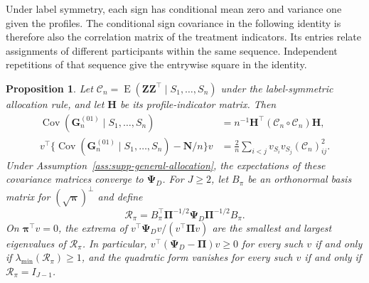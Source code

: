 \documentclass[12pt,a4paper]{article}
\newtheorem{proposition}{Proposition}
\theoremstyle{definition}
\theoremstyle{remark}\newtheorem{remark}{Remark}
\numberwithin{equation}{section}
\newcommand{\E}{\operatorname{E}}
\newcommand{\Cov}{\operatorname{Cov}}
\begin{document}
Under label symmetry, each sign has conditional mean zero and variance one given the profiles. The conditional sign covariance in the following identity is therefore also the correlation matrix of the treatment indicators. Its entries relate assignments of different participants within the same sequence. Independent repetitions of that sequence give the entrywise square in the identity.

\begin{proposition}\label{prop:supp-sign}
Let $\mathcal C_n=\E(\bm Z\bm Z^\top\mid S_1,\ldots,S_n)$ under the label-symmetric allocation rule, and let $\bm H$ be its profile-indicator matrix. Then
\begin{align}
 \Cov(\bm G_n^{(01)}\mid S_1,\ldots,S_n)
   &=n^{-1}\bm H^\top(\mathcal C_n\circ\mathcal C_n)\bm H,\label{eq:supp-square-covariance}\\
 v^\top\{\Cov(\bm G_n^{(01)}\mid S_1,\ldots,S_n)-\bm N/n\}v
   &=\frac2n\sum_{i<j}v_{S_i}v_{S_j}(\mathcal C_n)_{ij}^2.\label{eq:supp-offdiagonal-square}
\end{align}
Under Assumption~\ref{ass:supp-general-allocation}, the expectations of these covariance matrices converge to $\bm\Psi_D$. For $J\ge2$, let $B_\pi$ be an orthonormal basis matrix for $(\sqrt{\bm\pi})^\perp$ and define
\[
 \mathcal R_\pi=B_\pi^\top\bm\Pi^{-1/2}\bm\Psi_D\bm\Pi^{-1/2}B_\pi.
\]
On $\bm\pi^\top v=0$, the extrema of $v^\top\bm\Psi_Dv/(v^\top\bm\Pi v)$ are the smallest and largest eigenvalues of $\mathcal R_\pi$. In particular, $v^\top(\bm\Psi_D-\bm\Pi)v\ge0$ for every such $v$ if and only if $\lambda_{\min}(\mathcal R_\pi)\ge1$, and the quadratic form vanishes for every such $v$ if and only if $\mathcal R_\pi=I_{J-1}$.
\end{proposition}
\end{document}

